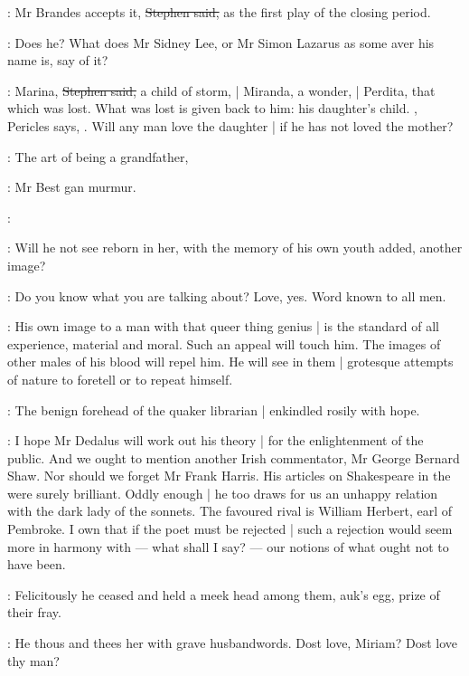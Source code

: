 \Stephen:
Mr Brandes accepts it,
\sout{Stephen said,}
as the first play of the closing period.

\eglinton:
Does he?
What does Mr Sidney Lee,
or Mr Simon Lazarus as some aver his name is,
say of it?

\Stephen:
Marina,
\sout{Stephen said,}
a child of storm, |
Miranda, a wonder, |
Perdita, that which was lost.
What was lost is given back to him:
his daughter's child.
,
Pericles says,
.
Will any man love the daughter |
if he has not loved the mother?

\best:
The art of being a grandfather,

:
Mr Best gan murmur.

\best:

\Stephen:
Will he not see reborn in her,
with the memory of his own youth added,
another image?

\StephenInt:
Do you know what you are talking about?
Love,
yes.
Word known to all men.

\Stephen:
His own image to a man with that queer thing genius |
is the standard of all experience,
material and moral.
Such an appeal will touch him.
The images of other males of his blood will repel him.
He will see in them |
grotesque attempts of nature to foretell or to repeat himself.

:
The benign forehead of the quaker librarian |
enkindled rosily with hope.

\librarian:
I hope Mr Dedalus will work out his theory |
for the enlightenment of the public.
And we ought to mention another Irish commentator,
Mr George Bernard Shaw.
Nor should we forget Mr Frank Harris.
His articles on Shakespeare in the  were surely brilliant.
Oddly enough |
he too draws for us an unhappy relation with the dark lady of the sonnets.
The favoured rival is William Herbert, earl of Pembroke.
I own that if the poet must be rejected |
such a rejection would seem more in harmony with ---
what shall I say? ---
our notions of what ought not to have been.

:
Felicitously he ceased and held a meek head among them,
auk's egg,
prize of their fray.

\StephenInt:
He thous and thees her with grave husbandwords.
Dost love,
Miriam?
Dost love thy man?

